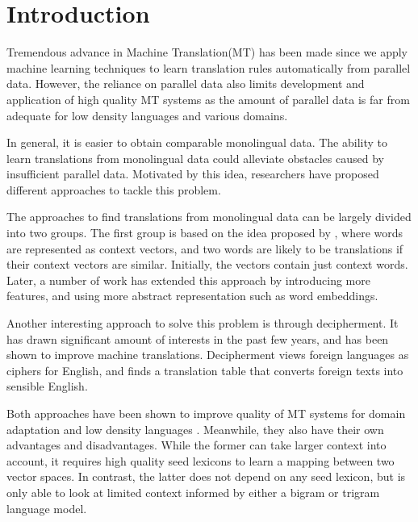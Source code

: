 \section{Introduction}
Tremendous advance in Machine Translation(MT) has been made since we apply machine learning techniques to learn translation rules automatically from parallel data. However, the reliance on parallel data also limits development and application of high quality MT systems as the amount of parallel data is far from adequate for low density languages and various domains.

In general, it is easier to obtain comparable monolingual data. The ability to learn translations from monolingual data could alleviate obstacles caused by insufficient parallel data. Motivated by this idea, researchers have proposed different approaches to tackle this problem. 

The approaches to find translations from monolingual data can be largely divided into two groups. The first group is based on the idea proposed by , where words are represented as context vectors, and two words are likely to be translations if their context vectors are similar. Initially, the vectors contain just context words. Later, a number of work has extended this approach by introducing more features\cite{haghighi-EtAl:2008:ACLMain,Garera:2009,Bergsma:2011,Daume:2011:DAM:2002736.2002819,irvine-callisonburch:2013,irvine-callisonburch:2013:WMT}, and using more abstract representation such as word embeddings\cite{KlementievCOLING}.

Another interesting approach to solve this problem is through decipherment. It has drawn significant amount of interests in the past few years\cite{ravi-knight:2011,Nuhn:2012,dou-knight:2013:EMNLP,ravi:2013}, and has been shown to improve machine translations. Decipherment views foreign languages as ciphers for English, and finds a translation table that converts foreign texts into sensible English. 

Both approaches have been shown to improve quality of MT systems for domain adaptation \cite{Daume:2011:DAM:2002736.2002819,Dou:2012,irvineQuirkDaumeEMNLP13} and low density languages \cite{irvine-callisonburch:2013:WMT,dou-vaswani-knight:2014:EMNLP2014}. Meanwhile, they also have their own advantages and disadvantages. While the former can take larger context into account, it requires high quality seed lexicons to learn a mapping between two vector spaces. In contrast, the latter does not depend on any seed lexicon, but is only able to look at limited context informed by either a bigram or trigram language model.  

